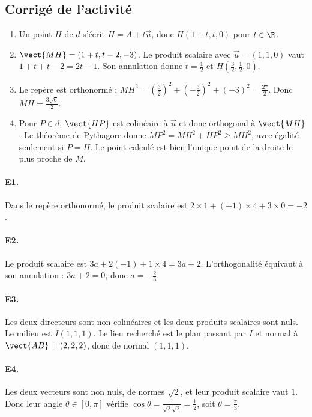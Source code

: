 \subsection{Corrigé de l'activité}\begin{enumerate}
\item Un point $H$ de $d$ s'écrit $H=A+t\vec u$, donc $H(1+t,t,0)$ pour $t\in\R$.
\item $\vect{MH}=(1+t,t-2,-3)$. Le produit scalaire avec $\vec u=(1,1,0)$ vaut $1+t+t-2=2t-1$. Son annulation donne $t=\frac{1}{2}$ et $H(\frac{3}{2},\frac{1}{2},0)$.
\item Le repère est orthonormé : $MH^2=(\frac{3}{2})^2+(-\frac{3}{2})^2+(-3)^2=\frac{27}{2}$. Donc $MH=\frac{3\sqrt{6}}{2}$.
\item Pour $P\in d$, $\vect{HP}$ est colinéaire à $\vec u$ et donc orthogonal à $\vect{MH}$. Le théorème de Pythagore donne $MP^2=MH^2+HP^2\ge MH^2$, avec égalité seulement si $P=H$. Le point calculé est bien l'unique point de la droite le plus proche de $M$.
\end{enumerate}

\paragraph{E1.}Dans le repère orthonormé, le produit scalaire est $2\times1+(-1)\times4+3\times0=-2$.

\paragraph{E2.}Le produit scalaire est $3a+2(-1)+1\times4=3a+2$. L'orthogonalité équivaut à son annulation : $3a+2=0$, donc $a=-\frac{2}{3}$.

\paragraph{E3.}Les deux directeurs sont non colinéaires et les deux produits scalaires sont nuls. Le milieu est $I(1,1,1)$. Le lieu recherché est le plan passant par $I$ et normal à $\vect{AB}=(2,2,2)$, donc de normal $(1,1,1)$.

\paragraph{E4.}Les deux vecteurs sont non nuls, de normes $\sqrt2$, et leur produit scalaire vaut $1$. Donc leur angle $\theta\in[0,\pi]$ vérifie $\cos \theta=\frac{1}{\sqrt2\sqrt2}=\frac{1}{2}$, soit $\theta=\frac{\pi}{3}$.

